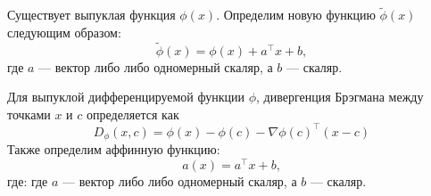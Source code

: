 \documentclass[12pt]{scrartcl}
\begin{document}
Существует выпуклая функция $\phi(x)$. Определим новую функцию $\tilde{\phi}(x)$ следующим образом:
\begin{equation}\label{eq:basic+affine}
    \tilde{\phi}(x) = \phi(x) + a^{\top}x + b,
\end{equation}
где $a$ --- вектор либо либо одномерный скаляр, а $b$ --- скаляр.

Для выпуклой дифференцируемой функции $\phi$, дивергенция Брэгмана между точками $x$ и $c$ определяется как
\begin{equation}\label{eq:basic_function}
    D_\phi (x,c) = \phi (x) - \phi (c) - \nabla \phi (c)^{\top} (x - c)
\end{equation}
Также определим аффинную функцию:
\begin{equation}\label{eq:affine_term}
    a(x) = a^{\top} x + b,
\end{equation}
где: где $a$ --- вектор либо либо одномерный скаляр, а $b$ --- скаляр.
\end{document}
